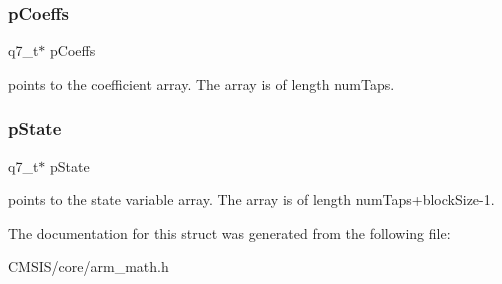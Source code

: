 \subsubsection{\texorpdfstring{p\+Coeffs}{pCoeffs}}
{\footnotesize\ttfamily q7\+\_\+t$\ast$ p\+Coeffs}

points to the coefficient array. The array is of length num\+Taps. \mbox{\label{structarm__fir__instance__q7_aa8f67102521b620af6f259afdcf29785}} 
\subsubsection{\texorpdfstring{p\+State}{pState}}
{\footnotesize\ttfamily q7\+\_\+t$\ast$ p\+State}

points to the state variable array. The array is of length num\+Taps+block\+Size-\/1. 

The documentation for this struct was generated from the following file\+:\begin{DoxyCompactItemize}
\item 
C\+M\+S\+I\+S/core/arm\+\_\+math.\+h\end{DoxyCompactItemize}
